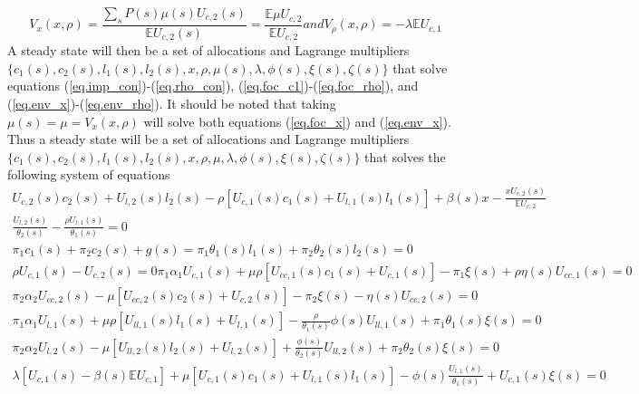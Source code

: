\documentclass[thmsb,11pt]{article}
\begin{document}
{\begin{subequations}
\begin{equation}
	V_x(x,\rho)= \frac{\sum_sP(s) \mu(s) U_{c,2}(s)}{\mathbb E U_{c,2}(s)} = \frac{\mathbb E\mu U_{c,2}}{\mathbb E U_{c,2}}\label{eq.env_x}
\end{equation}and
\begin{equation}
	V_\rho(x,\rho) = -\lambda \mathbb E U_{c,1}\label{eq.env_rho}
\end{equation}\end{subequations}  A steady state will then be a set of allocations and Lagrange multipliers $\{c_1(s),c_2(s),l_1(s),l_2(s),x,\rho,\mu(s),\lambda,\phi(s),\xi(s),\zeta(s)\}$  that solve equations (\ref{eq.imp_con})-(\ref{eq.rho_con}), (\ref{eq.foc_c1})-(\ref{eq.foc_rho}), and (\ref{eq.env_x})-(\ref{eq.env_rho}).  It should be noted that taking $\mu(s) = \mu = V_x(x,\rho)$ will solve both equations (\ref{eq.foc_x}) and (\ref{eq.env_x}).  Thus a steady state will be a set of allocations and Lagrange multipliers $\{c_1(s),c_2(s),l_1(s),l_2(s),x,\rho,\mu,\lambda,\phi(s),\xi(s),\zeta(s)\}$ that solves the following system of equations
\begin{subequations}
\begin{align}
	U_{c,2}(s)c_2(s)+U_{l,2}(s)l_2(s) - \rho\left[U_{c,1}(s)c_1(s)+U_{l,1}(s)l_1(s)\right]+\beta(s)x -\frac{x U_{c,2}(s)}{\mathbb E U_{c,2}}\label{eq.FSS_start}\\
	\frac{U_{l,2}(s)}{\theta_2(s)} - \frac{\rho U_{l,1}(s)}{\theta_1(s)}=0\\
	\pi_1 c_1(s)+\pi_2 c_2(s)+g(s) = \pi_1 \theta_1(s) l_1(s) + \pi_2\theta_2(s) l_2(s)=0\\
	\rho U_{c,1}(s)-U_{c,2}(s) =0
	\pi_1\alpha_1 U_{c,1}(s) + \mu\rho\left[ U_{cc,1}(s) c_1(s)+U_{c,1}(s)\right] -\pi_1\xi(s)  + \rho\eta(s)U_{cc,1}(s) = 0\\
	\pi_2\alpha_2 U_{cc,2}(s) - \mu\left[ U_{cc,2}(s)c_2(s)+U_{c,2}(s)\right] - \pi_2\xi(s) -\eta(s) U_{cc,2}(s) = 0\\
	\pi_1 \alpha_1 U_{l,1}(s) +\mu\rho\left[U_{ll,1}(s) l_1(s) + U_{l,1}(s)\right] - \frac\rho{\theta_1(s)}\phi(s) U_{ll,1}(s) + \pi_1\theta_1(s)\xi(s) = 0\\
	\pi_2\alpha_2 U_{l,2}(s)  -\mu\left[U_{ll,2}(s)l_2(s) + U_{l,2}(s)\right] +\frac{\phi(s)}{\theta_2(s)} U_{ll,2}(s) + \pi_2\theta_2(s)\xi(s) = 0\\
	\lambda\left[U_{c,1}(s)-\beta(s)\mathbb E U_{c,1}\right] + \mu\left[ U_{c,1}(s)c_1(s) + U_{l,1}(s) l_1(s)\right] - \phi(s)\frac{U_{l,1}(s)}{\theta_1(s)} + U_{c,1}(s)\xi(s) = 0\label{eq.FSS_end}

\end{align}
\end{subequations}}
\end{document}
